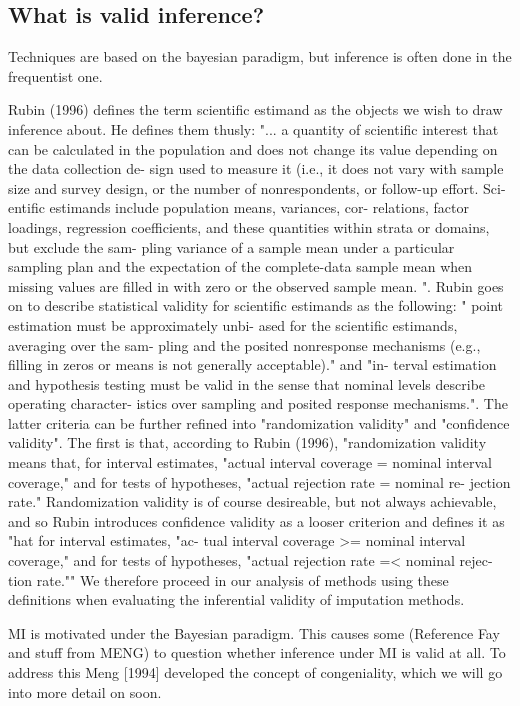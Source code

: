 \documentclass{article}
\begin{document}
	\subsection{What is valid inference?}
	Techniques are based on the bayesian paradigm, but inference is often done in the frequentist one.
	
	Rubin (1996) defines the term scientific estimand as the objects we wish to draw inference about. He defines them thusly: "... a quantity of scientific
	interest that can be calculated in the population and does
	not change its value depending on the data collection de-
	sign used to measure it (i.e., it does not vary with sample
	size and survey design, or the number of nonrespondents,
	or follow-up effort. Sci-
	entific estimands include population means, variances, cor-
	relations, factor loadings, regression coefficients, and these
	quantities within strata or domains, but exclude the sam-
	pling variance of a sample mean under a particular sampling
	plan and the expectation of the complete-data sample mean
	when missing values are filled in with zero or the observed sample mean. ". Rubin goes on to describe statistical validity for scientific estimands as the following: " point estimation must be approximately unbi-
	ased for the scientific estimands, averaging over the sam-
	pling and the posited nonresponse mechanisms (e.g., filling
	in zeros or means is not generally acceptable)." and "in-
	terval estimation and hypothesis testing must be valid in
	the sense that nominal levels describe operating character-
	istics over sampling and posited response mechanisms.". The latter criteria can be further refined into "randomization validity" and "confidence validity". The first is that, according to Rubin (1996),  "randomization validity means that, for interval estimates,
	"actual interval coverage = nominal interval coverage," and
	for tests of hypotheses, "actual rejection rate = nominal re-
	jection rate."  Randomization validity is of course desireable, but not always achievable, and so Rubin introduces confidence validity as a looser criterion and defines it as "hat for interval estimates, "ac-
	tual interval coverage >= nominal interval coverage," and for
	tests of hypotheses, "actual rejection rate =< nominal rejec-
	tion rate."" We therefore proceed in our analysis of methods using these definitions when evaluating the inferential validity of imputation methods.
	
	MI is motivated under the Bayesian paradigm. This causes some (Reference Fay and stuff from MENG) to question whether inference under MI is valid at all. To address this Meng [1994] developed the concept of congeniality, which we will go into more detail on soon.
	
\end{document}
